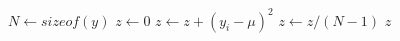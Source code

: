 \documentclass[preview,border=5pt,12pt]{standalone}
\begin{document}
\begin{algorithmic}[1]
        \State $N \gets sizeof(y)$
        \State $z \gets 0$
                \State $z \gets z + (y_i - \mu)^2$
            \EndIf
        \EndFor
        \State $z \gets z / (N-1)$
        \State \Return $z$
    \EndFunction
\end{algorithmic}
\end{document}
